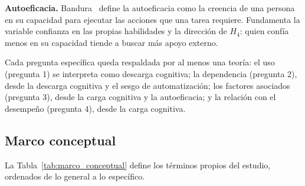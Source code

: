 \documentclass[12pt,letterpaper]{article}
\numberwithin{table}{section}
\numberwithin{figure}{section}
\begin{document}
\textbf{Autoeficacia.} Bandura~\cite{bandura1977self} define la autoeficacia como la creencia de una persona en su capacidad para ejecutar las acciones que una tarea requiere. Fundamenta la variable confianza en las propias habilidades y la dirección de $H_4$: quien confía menos en su capacidad tiende a buscar más apoyo externo.

Cada pregunta específica queda respaldada por al menos una teoría: el uso (pregunta 1) se interpreta como descarga cognitiva; la dependencia (pregunta 2), desde la descarga cognitiva y el sesgo de automatización; los factores asociados (pregunta 3), desde la carga cognitiva y la autoeficacia; y la relación con el desempeño (pregunta 4), desde la carga cognitiva.

\subsection{Marco conceptual}

La Tabla~\ref{tab:marco_conceptual} define los términos propios del estudio, ordenados de lo general a lo específico.
\end{document}

